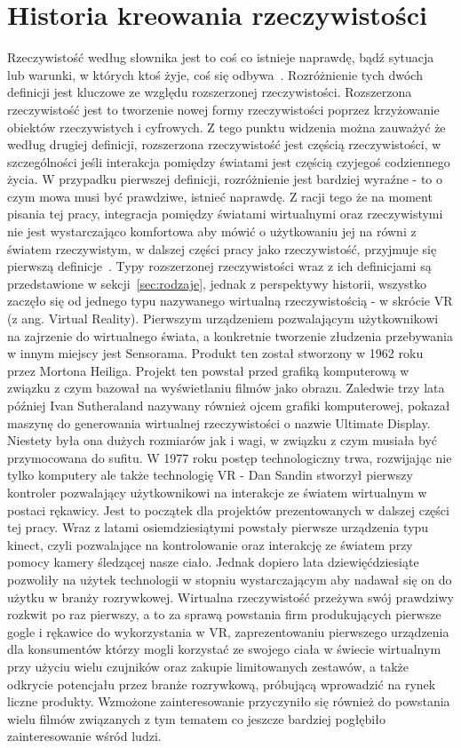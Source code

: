 \section{Historia kreowania rzeczywistości}
\label{sec:historia}
Rzeczywistość według słownika jest to coś co istnieje naprawdę, bądź sytuacja lub warunki, w których ktoś żyje, coś się odbywa~\cite{sjp1}. Rozróżnienie tych dwóch definicji jest kluczowe ze względu rozszerzonej rzeczywistości. Rozszerzona rzeczywistość jest to tworzenie nowej formy rzeczywistości poprzez krzyżowanie obiektów rzeczywistych i cyfrowych. Z tego punktu widzenia można zauważyć że według drugiej definicji, rozszerzona rzeczywistość jest częścią rzeczywistości, w szczególności jeśli interakcja pomiędzy światami jest częścią czyjegoś codziennego życia. W przypadku pierwszej definicji, rozróżnienie jest bardziej wyraźne - to o czym mowa musi być prawdziwe, istnieć naprawdę. Z racji tego że na moment pisania tej pracy, integracja pomiędzy światami wirtualnymi oraz rzeczywistymi nie jest wystarczająco komfortowa aby mówić o użytkowaniu jej na równi z światem rzeczywistym, w dalszej części pracy jako rzeczywistość, przyjmuje się pierwszą definicje~\cite{XR}. Typy rozszerzonej rzeczywistości wraz z ich definicjami są przedstawione w sekcji~\ref{sec:rodzaje}, jednak z perspektywy historii, wszystko zaczęło się od jednego typu nazywanego wirtualną rzeczywistością - w skrócie VR (z ang. Virtual Reality). Pierwszym urządzeniem pozwalającym użytkownikowi na zajrzenie do wirtualnego świata, a konkretnie tworzenie złudzenia przebywania w innym miejscy jest Sensorama. Produkt ten został stworzony w 1962 roku przez Mortona Heiliga. Projekt ten powstał przed grafiką komputerową w związku z czym bazował na wyświetlaniu filmów jako obrazu. Zaledwie trzy lata później Ivan Sutheraland nazywany również ojcem grafiki komputerowej, pokazał maszynę do generowania wirtualnej rzeczywistości o nazwie Ultimate Display. Niestety była ona dużych rozmiarów jak i wagi, w związku z czym musiała być przymocowana do sufitu. W 1977 roku postęp technologiczny trwa, rozwijając nie tylko komputery ale także technologię VR - Dan Sandin stworzył pierwszy kontroler pozwalający użytkownikowi na interakcje ze światem wirtualnym w postaci rękawicy. Jest to początek dla projektów prezentowanych w dalszej części tej pracy. Wraz z latami osiemdziesiątymi powstały pierwsze urządzenia typu kinect, czyli pozwalające na kontrolowanie oraz interakcję ze światem przy pomocy kamery śledzącej nasze ciało. Jednak dopiero lata dziewięćdziesiąte pozwoliły na użytek technologii w stopniu wystarczającym aby nadawał się on do użytku w branży rozrywkowej. Wirtualna rzeczywistość przeżywa swój prawdziwy rozkwit po raz pierwszy, a to za sprawą powstania firm produkujących pierwsze gogle i rękawice do  wykorzystania w VR, zaprezentowaniu pierwszego urządzenia dla konsumentów którzy mogli korzystać ze swojego ciała w świecie wirtualnym przy użyciu wielu czujników oraz zakupie limitowanych zestawów, a także odkrycie potencjału przez branże rozrywkową, próbującą wprowadzić na rynek liczne produkty. Wzmożone zainteresowanie przyczyniło się również do powstania wielu filmów związanych z tym tematem co jeszcze bardziej pogłębiło zainteresowanie wśród ludzi. 